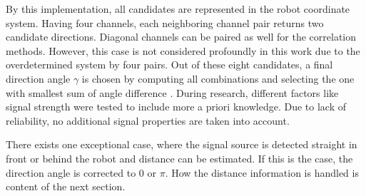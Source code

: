 By this implementation, all candidates are represented in the robot coordinate system.
Having four channels, each neighboring channel pair returns two candidate directions.
Diagonal channels can be paired as well for the correlation methods.
However, this case is not considered profoundly in this work due to the overdetermined
system by four pairs.
Out of these eight candidates, a final direction angle $\gamma$ is chosen
by computing all combinations and selecting the one with smallest sum of angle difference .
During research, different factors like signal strength  were tested to include
more a priori knowledge.
Due to lack of reliability, no additional signal properties are taken into account.

There exists one exceptional case, where the signal source is detected straight in front
or behind the robot and distance can be estimated.
If this is the case, the direction angle is corrected to 0 or $\pi$.
How the distance information is handled is content of the next section.
